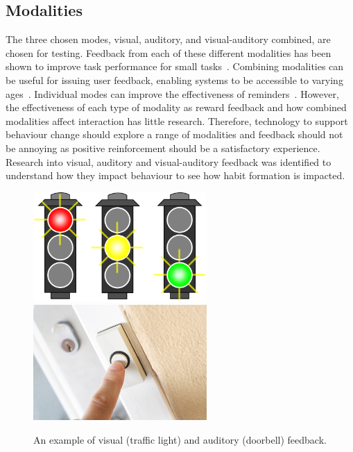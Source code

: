 
\subsection{Modalities}
The three chosen modes, visual, auditory, and visual-auditory combined, are chosen for testing. Feedback from each of these different modalities has been shown to improve task performance for small tasks~\cite{chi_oussama_tap_the_shapetones}. Combining modalities can be useful for issuing user feedback, enabling systems to be accessible to varying ages~\cite{article_user_centred_multimodal_reminders}. Individual modes can improve the effectiveness of reminders~\cite{multi_modal_reminders_less_disruptive, article_designing_multimodal_reminders_for_home}. However, the effectiveness of each type of modality as reward feedback and how combined modalities affect interaction has little research. Therefore, technology to support behaviour change should explore a range of modalities and feedback should not be annoying as positive reinforcement should be a satisfactory experience. Research into visual, auditory and visual-auditory feedback was identified to understand how they impact behaviour to see how habit formation is impacted.

\begin{figure}[H]
  \centering
  \includegraphics[width=2.6in]{../resources/visual.png}
  \hspace{10px}
  \includegraphics[width=2.6in]{../resources/audio.png}
  \caption{An example of visual (traffic light) and auditory (doorbell) feedback.}
  \label{fig:visual_audio}
\end{figure}

